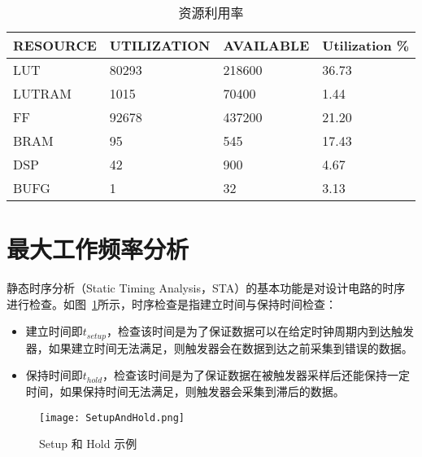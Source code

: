 \begin{table}[!htbp]
    \caption{资源利用率}
    \label{tab:Resource Report}
    \centering
    \footnotesize%
    \setlength{\tabcolsep}{4pt}%
    \renewcommand{\arraystretch}{1.2}%
    \begin{tabular}{llll}
        \toprule
        \textbf{RESOURCE} & \textbf{UTILIZATION} & \textbf{AVAILABLE} & \textbf{Utilization \%} \\
        \midrule
        LUT               & 80293                & 218600               & 36.73                   \\
        LUTRAM            & 1015                 & 70400                & 1.44                    \\
        FF                & 92678                & 437200               & 21.20                   \\
        BRAM              & 95                   & 545                  & 17.43                   \\
        DSP               & 42                   & 900                  & 4.67                    \\
        BUFG              & 1                    & 32                   & 3.13                    \\
        \bottomrule                   
    \end{tabular}
\end{table}

\section{最大工作频率分析}

静态时序分析（Static Timing Analysis，STA）的基本功能是对设计电路的时序进行检查。如图~\ref{fig:Setup and Hold}所示，时序检查是指建立时间与保持时间检查：

\begin{itemize}
    \item 建立时间即$t_{setup}$，检查该时间是为了保证数据可以在给定时钟周期内到达触发器，如果建立时间无法满足，则触发器会在数据到达之前采集到错误的数据。
    \item 保持时间即$t_{hold}$，检查该时间是为了保证数据在被触发器采样后还能保持一定时间，如果保持时间无法满足，则触发器会采集到滞后的数据。
\end{itemize}

\begin{figure}[!htbp]
    \centering
    \texttt{[image: SetupAndHold.png]}
    \caption{Setup 和 Hold 示例}
    \label{fig:Setup and Hold}
\end{figure}

